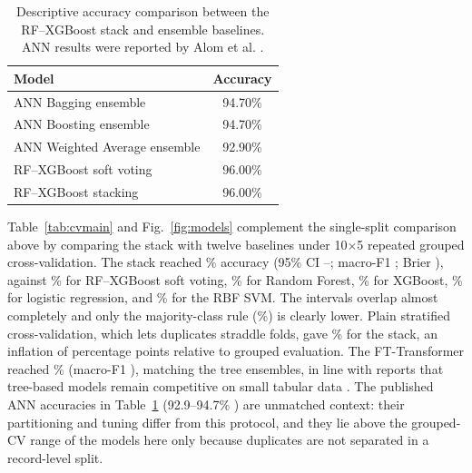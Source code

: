 \documentclass[a4paper,fleqn]{cas-dc}
\begin{document}
\begin{table}[width=\columnwidth,pos=!tbp]
\centering
\caption{Descriptive accuracy comparison between the RF--XGBoost stack and ensemble baselines. ANN results were reported by Alom et al. \cite{alom2024}.}
\label{tab:basecomparison}
\small
\begin{tabularx}{0.74\linewidth}{@{}X c@{}}
\toprule
Model & Accuracy \\
\midrule
ANN Bagging ensemble & 94.70\% \\
ANN Boosting ensemble & 94.70\% \\
ANN Weighted Average ensemble & 92.90\% \\
RF--XGBoost soft voting & 96.00\% \\
RF--XGBoost stacking & 96.00\% \\
\bottomrule
\end{tabularx}
\end{table}

Table~\ref{tab:cvmain} and Fig.~\ref{fig:models} complement the single-split comparison above by comparing the stack with twelve baselines under 10$\times$5 repeated grouped cross-validation. The stack reached \AccStackG\% accuracy (95\% CI \CIloStackG--\CIhiStackG; macro-F1 \FStackG; Brier \BrierStackG), against \AccVoteG\% for RF--XGBoost soft voting, \AccRFG\% for Random Forest, \AccXGBG\% for XGBoost, \AccLRG\% for logistic regression, and \AccSVMG\% for the RBF SVM. The intervals overlap almost completely and only the majority-class rule (\AccMajG\%) is clearly lower. Plain stratified cross-validation, which lets duplicates straddle folds, gave \AccStackN\% for the stack, an inflation of \InflationNaiveGrouped{} percentage points relative to grouped evaluation. The FT-Transformer reached \AccFTTG\% (macro-F1 \FFTTG), matching the tree ensembles, in line with reports that tree-based models remain competitive on small tabular data \cite{grinsztajn2022}. The published ANN accuracies in Table~\ref{tab:basecomparison} (92.9--94.7\% \cite{alom2024}) are unmatched context: their partitioning and tuning differ from this protocol, and they lie above the grouped-CV range of the models here only because duplicates are not separated in a record-level split.

\begin{table}[width=\textwidth,pos=!tbp]
\centering
\caption{Repeated grouped cross-validation (10$\times$5, 374 records, folds grouped by predictor vector). Accuracy with 95\% cluster-bootstrap interval, macro-F1, macro one-vs-rest AUC, Brier score, log-loss, and five-bin expected calibration error (ECE$_5$).}
\label{tab:cvmain}
\footnotesize
\resizebox{\textwidth}{!}{}
\end{table}
\end{document}
